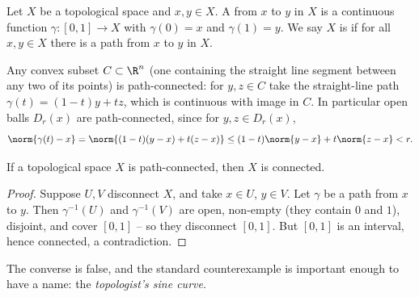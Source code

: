 \begin{definition}[Path]
    Let $X$ be a topological space and $x, y \in X$. A  from $x$ to $y$ in $X$ is a continuous function $\gamma: [0, 1] \rightarrow X$ with $\gamma(0) = x$ and $\gamma(1) = y$. We say $X$ is  if for all $x, y \in X$ there is a path from $x$ to $y$ in $X$.
\end{definition}

\begin{example}
    Any convex subset $C \subset \R^n$ (one containing the straight line segment between any two of its points) is path-connected: for $y, z \in C$ take the straight-line path $\gamma(t) = (1 - t)y + tz$, which is continuous with image in $C$. In particular open balls $D_r(x)$ are path-connected, since for $y, z \in D_r(x)$,
    $$
    \norm{\gamma(t) - x} = \norm{(1-t)(y - x) + t(z - x)} \leq (1 - t)\norm{y - x} + t\norm{z - x} < r.
    $$
\end{example}

\begin{theorem}
    If a topological space $X$ is path-connected, then $X$ is connected.
\end{theorem}
\begin{proof}
    Suppose $U, V$ disconnect $X$, and take $x \in U$, $y \in V$. Let $\gamma$ be a path from $x$ to $y$. Then $\gamma^{-1}(U)$ and $\gamma^{-1}(V)$ are open, non-empty (they contain $0$ and $1$), disjoint, and cover $[0, 1]$ -- so they disconnect $[0, 1]$. But $[0, 1]$ is an interval, hence connected, a contradiction.
\end{proof}

The converse is false, and the standard counterexample is important enough to have a name: the \emph{topologist's sine curve}.

